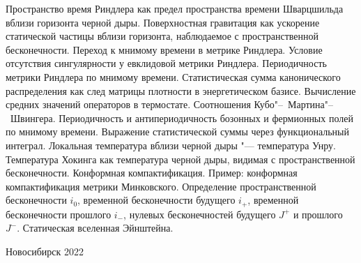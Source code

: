 \documentclass[12pt,pagesize,paper=192mm:108mm,landscape]{scrbook}
\begin{document}
\begin{titlepage}
  \vspace*{-0.5em}
  \begin{center}    

    



     \vfill

     \normalsize
     \begin{minipage}{0.9\linewidth}
       Пространство время Риндлера как предел пространства времени
       Шварцшильда вблизи горизонта черной дыры. Поверхностная
       гравитация как ускорение статической частицы вблизи горизонта,
       наблюдаемое с пространственной бесконечности. Переход к мнимому
       времени в метрике Риндлера. Условие отсутствия сингулярности у
       евклидовой метрики Риндлера. Периодичность метрики Риндлера по
       мнимому времени. Статистическая сумма канонического
       распределения как след матрицы плотности в энергетическом
       базисе. Вычисление средних значений операторов в
       термостате. Соотношения Кубо"--~Мартина"--~Швингера. Периодичность и
       антипериодичность бозонных и фермионных полей по мнимому
       времени. Выражение статистической суммы через функциональный
       интеграл. Локальная температура вблизи черной дыры "---
       температура Унру. Температура Хокинга как температура черной
       дыры, видимая с пространственной бесконечности. Конформная
       компактификация. Пример: конформная компактификация метрики
       Минковского. Определение пространственной бесконечности $i_0$,
       временной бесконечности будущего $i_{+}$, временной бесконечности
       прошлого $i_{-}$, нулевых бесконечностей будущего $J^{+}$ и прошлого
       $J^{-}$. Статическая вселенная Эйнштейна.
     \end{minipage}
    \vfill

    \normalsize \ccbysa\hspace{0.5em}  Новосибирск 2022
  \end{center}
\end{titlepage}
\end{document}
